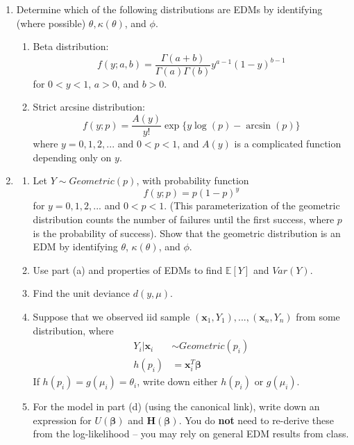 \documentclass[11pt]{article}
\begin{document}
\begin{enumerate}
\bigskip

\item Determine which of the following distributions are EDMs by identifying (where possible) $\theta, \kappa(\theta)$, and $\phi$.

\begin{enumerate}
\item Beta distribution:
$$f(y; a, b) = \frac{\Gamma(a + b)}{\Gamma(a)\Gamma(b)}y^{a-1}(1 - y)^{b-1}$$
for $0 < y < 1$, $a > 0$, and $b > 0$.

\item Strict arcsine distribution:
$$f(y; p) = \frac{A(y)}{y!} \exp\{y \log(p) - \arcsin(p) \}$$
where $y = 0, 1, 2, ...$ and $0 < p < 1$, and $A(y)$ is a complicated function depending only on $y$.
\end{enumerate}

\bigskip

\item
\begin{enumerate}
\item Let $Y \sim Geometric(p)$, with probability function
$$f(y; p) = p(1 - p)^y$$
for $y = 0, 1, 2,...$ and $0 < p < 1$. (This parameterization of the geometric distribution counts the number of failures until the first success, where $p$ is the probability of success). Show that the geometric distribution is an EDM by identifying $\theta$, $\kappa(\theta)$, and $\phi$.

\item Use part (a) and properties of EDMs to find $\mathbb{E}[Y]$ and $Var(Y)$.

\item Find the unit deviance $d(y, \mu)$.

\item Suppose that we observed iid sample $(\mathbf{x}_1, Y_1),...,(\mathbf{x}_n, Y_n)$ from some distribution, where
\begin{align*}
Y_i | \mathbf{x}_i &\sim Geometric(p_i) \\
h(p_i) &= \mathbf{x}_i^T \boldsymbol{\beta}
\end{align*}
If $h(p_i) = g(\mu_i) = \theta_i$, write down either $h(p_i)$ or $g(\mu_i)$.

\item For the model in part (d) (using the canonical link), write down an expression for $U(\boldsymbol{\beta})$ and $\mathbf{H}(\boldsymbol{\beta})$. You do \textbf{not} need to re-derive these from the log-likelihood -- you may rely on general EDM results from class.
\end{enumerate}


\end{enumerate}
\end{document}
